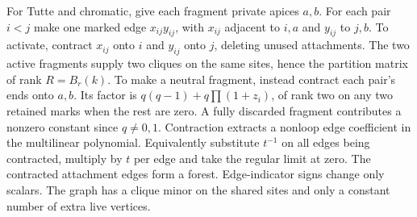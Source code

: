 \documentclass[11pt]{article}
\theoremstyle{definition}
\begin{document}
For Tutte and chromatic, give each fragment private apices \(a,b\). For each pair \(i<j\) make one marked edge \(x_{ij}y_{ij}\), with \(x_{ij}\) adjacent to \(i,a\) and \(y_{ij}\) to \(j,b\). To activate, contract \(x_{ij}\) onto \(i\) and \(y_{ij}\) onto \(j\), deleting unused attachments. The two active fragments supply two cliques on the same sites, hence the partition matrix of rank \(R=B_r(k)\). To make a neutral fragment, instead contract each pair's ends onto \(a,b\). Its factor is \(q(q-1)+q\prod(1+z_i)\), of rank two on any two retained marks when the rest are zero. A fully discarded fragment contributes a nonzero constant since \(q\ne0,1\). Contraction extracts a nonloop edge coefficient in the multilinear polynomial. Equivalently substitute \(t^{-1}\) on all edges being contracted, multiply by \(t\) per edge and take the regular limit at zero. The contracted attachment edges form a forest. Edge-indicator signs change only scalars. The graph has a clique minor on the shared sites and only a constant number of extra live vertices.
\end{document}
